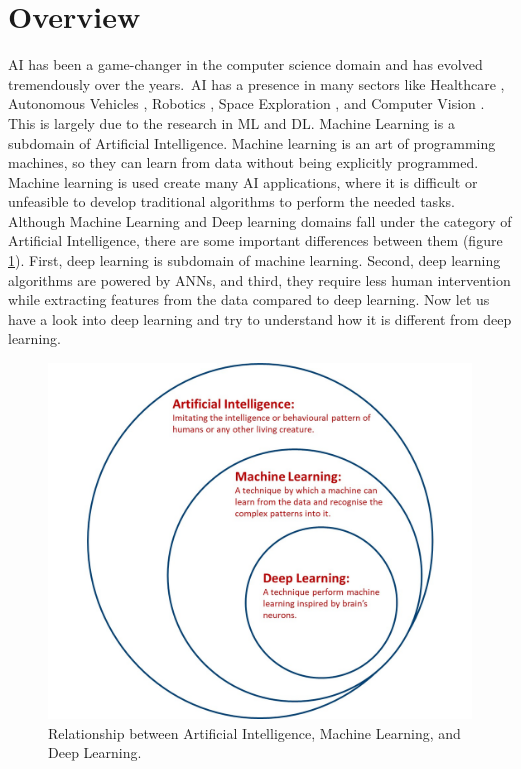 \justifying
\setlength{\parskip}{1em}


\section{Overview}

\ac{AI} has been a game-changer in the computer science domain and has evolved tremendously over the years.\ \ac{AI} has a presence in many sectors like Healthcare \cite{Yu.2018}, Autonomous Vehicles \cite{Yurtsever_2020}, Robotics \cite{10.1007/978-3-642-82153-0_2}, Space Exploration \cite{Girimonte2007}, and Computer Vision \cite{2020}. This is largely due to the research in \ac{ML} and \ac{DL}. Machine Learning is a subdomain of Artificial Intelligence. Machine learning is an art of programming machines, so they can learn from data without being explicitly programmed. Machine learning is used create many \ac{AI} applications, where it is difficult or unfeasible to develop traditional algorithms to perform the needed tasks. Although Machine Learning and Deep learning domains fall under the category of Artificial Intelligence, there are some important differences between them (figure \ref{fig:deepLearningSubset}). First, deep learning is subdomain of machine learning. Second, deep learning algorithms are powered by \acp{ANN}, and third, they require less human intervention while extracting features from the data compared to deep learning. Now let us have a look into deep learning and try to understand how it is different from deep learning.

\begin{figure}[H]
        \begin{center}
 	    \includegraphics[scale=0.25]{images/deeplearningsubset.jpg}
	    \caption[Relationship between Artificial Intelligence, Machine Learning, and Deep Learning.]{Relationship between Artificial Intelligence, Machine Learning, and Deep Learning.}
	    \label{fig:deepLearningSubset}
	    \end{center}
\end{figure}


